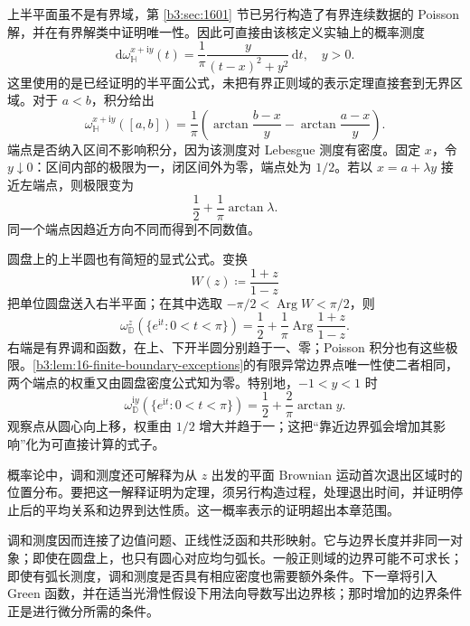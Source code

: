 \ProseParagraphBreak
上半平面虽不是有界域，第 \ref{b3:sec:1601} 节已另行构造了有界连续数据的 Poisson 解，并在有界解类中证明唯一性。因此可直接由该核定义实轴上的概率测度
\[
 \mathrm d\omega_{\mathbb H}^{x+\mathrm iy}(t)
 =\frac1\pi\frac{y}{(t-x)^2+y^2}\,\mathrm dt,
 \quad y>0.
\]
这里使用的是已经证明的半平面公式，未把有界正则域的表示定理直接套到无界区域。对于 \(a<b\)，积分给出
\begin{equation}\label{b3:eq:16-halfplane-interval}
 \omega_{\mathbb H}^{x+\mathrm iy}([a,b])
 =\frac1\pi\left(\arctan\frac{b-x}{y}
                  -\arctan\frac{a-x}{y}\right).
\end{equation}
端点是否纳入区间不影响积分，因为该测度对 Lebesgue 测度有密度。固定 \(x\)，令 \(y\downarrow0\)：区间内部的极限为一，闭区间外为零，端点处为 \(1/2\)。若以 \(x=a+\lambda y\) 接近左端点，则极限变为
\[
 \frac12+\frac1\pi\arctan\lambda.
\]
同一个端点因趋近方向不同而得到不同数值。

\ProseParagraphBreak
圆盘上的上半圆也有简短的显式公式。变换
\[
 W(z)\coloneqq\frac{1+z}{1-z}
\]
把单位圆盘送入右半平面；在其中选取 \(-\pi/2<\operatorname{Arg}W<\pi/2\)，则
\[
 \omega_{\mathbb D}^z(\{e^{\mathrm it}:0<t<\pi\})
 =\frac12+\frac1\pi\operatorname{Arg}\frac{1+z}{1-z}.
\]
右端是有界调和函数，在上、下开半圆分别趋于一、零；Poisson 积分也有这些极限。\cref{b3:lem:16-finite-boundary-exceptions}的有限异常边界点唯一性使二者相同，两个端点的权重又由圆盘密度公式知为零。特别地，\(-1<y<1\) 时
\[
 \omega_{\mathbb D}^{\mathrm iy}(\{e^{\mathrm it}:0<t<\pi\})
 =\frac12+\frac{2}{\pi}\arctan y.
\]
观察点从圆心向上移，权重由 \(1/2\) 增大并趋于一；这把“靠近边界弧会增加其影响”化为可直接计算的式子。

\ProseParagraphBreak
概率论中，调和测度还可解释为从 \(z\) 出发的平面 Brownian 运动首次退出区域时的位置分布。要把这一解释证明为定理，须另行构造过程，处理退出时间，并证明停止后的平均关系和边界到达性质。这一概率表示的证明超出本章范围。

\ProseParagraphBreak
调和测度因而连接了边值问题、正线性泛函和共形映射。它与边界长度并非同一对象；即使在圆盘上，也只有圆心对应均匀弧长。一般正则域的边界可能不可求长；即使有弧长测度，调和测度是否具有相应密度也需要额外条件。下一章将引入 Green 函数，并在适当光滑性假设下用法向导数写出边界核；那时增加的边界条件正是进行微分所需的条件。
